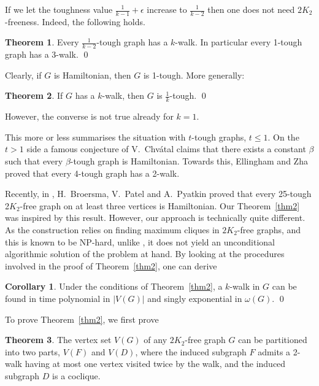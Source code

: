 \documentclass{amsart}
\theoremstyle{definition}
\newtheorem{theorem}{Theorem}
\newtheorem{corollary}{Corollary}
\begin{document}
If we let the toughness value $\frac{1}{k-1}+\epsilon$ increase to 
$\frac{1}{k-2}$ then
one does not need $2K_2$-freeness. Indeed, the following holds.
\begin{theorem}\cite{jackson1990k}\label{cthm1}
Every $\frac{1}{k-2}$-tough graph has a $k$-walk. 
In particular every 1-tough graph has a 3-walk. \qed
\end{theorem}
Clearly, if $G$ is
Hamiltonian, then $G$ is 1-tough.  More generally:
\begin{theorem}\cite{jackson1990k}\label{add}
If $G$ has a $k$-walk, then $G$ is $\frac{1}{k}$-tough. \qed
\end{theorem} 
However, the converse is not true already for $k=1$.  

This more or less summarises the situation with $t$-tough graphs, $t\leq 1$.
On the $t>1$ side 
a famous conjecture of V.~Chv\'{a}tal \cite{chvatal1973tough} claims
that there exists a constant $\beta$ such that every
$\beta$-tough graph is Hamiltonian.  
Towards this, 
Ellingham and Zha \cite{ellingham2000toughness} proved that
every 4-tough graph has a 2-walk.

Recently, in \cite{broersma2014toughness}, H.~Broersma, V.~Patel and A.~Pyatkin proved that 
every 25-tough 2$K_2$-free graph on at least three vertices is Hamiltonian.
Our Theorem~\ref{thm2} was inspired by this result.  
However, our approach is technically quite different. 
As the construction relies on finding maximum cliques in
$2K_2$-free graphs, and this is known to be NP-hard, 
unlike \cite{broersma2014toughness}, it does not yield an 
unconditional algorithmic solution of the problem at hand.
By looking at the procedures involved in the proof of Theorem~\ref{thm2}, 
one can derive
\begin{corollary}\label{alg}
Under the conditions of Theorem~\ref{thm2}, a $k$-walk in $G$ can be found in
time polynomial in $|V(G)|$ and singly exponential in $\omega(G)$. \qed
\end{corollary}

To prove Theorem~\ref{thm2}, we first prove
\begin{theorem}\label{addgen1} 
The  vertex set $V(G)$ of any $2K_2$-free graph $G$
can be partitioned into two parts, $V(F)$ and $V(D)$, where the
induced subgraph $F$ admits a 2-walk having at most one vertex visited twice by
the walk, and the induced subgraph $D$ is a coclique.
\end{theorem}
\end{document}
